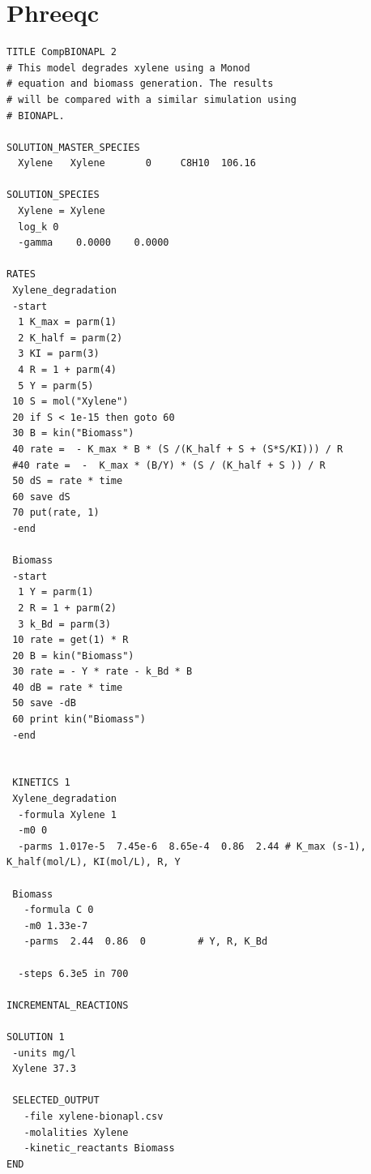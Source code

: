 \documentclass[12pt,twoside]{report}
\begin{document}
\section{Phreeqc}
\begin{verbatim}
TITLE CompBIONAPL 2
# This model degrades xylene using a Monod
# equation and biomass generation. The results
# will be compared with a similar simulation using
# BIONAPL.

SOLUTION_MASTER_SPECIES
  Xylene   Xylene       0     C8H10  106.16

SOLUTION_SPECIES
  Xylene = Xylene
  log_k 0
  -gamma    0.0000    0.0000

RATES
 Xylene_degradation
 -start
  1 K_max = parm(1)
  2 K_half = parm(2)
  3 KI = parm(3)  
  4 R = 1 + parm(4)
  5 Y = parm(5)
 10 S = mol("Xylene")
 20 if S < 1e-15 then goto 60
 30 B = kin("Biomass")
 40 rate =  - K_max * B * (S /(K_half + S + (S*S/KI))) / R
 #40 rate =  -  K_max * (B/Y) * (S / (K_half + S )) / R
 50 dS = rate * time
 60 save dS
 70 put(rate, 1)
 -end

 Biomass
 -start
  1 Y = parm(1)
  2 R = 1 + parm(2)
  3 k_Bd = parm(3)
 10 rate = get(1) * R
 20 B = kin("Biomass")
 30 rate = - Y * rate - k_Bd * B
 40 dB = rate * time
 50 save -dB
 60 print kin("Biomass")
 -end


 KINETICS 1
 Xylene_degradation
  -formula Xylene 1 
  -m0 0
  -parms 1.017e-5  7.45e-6  8.65e-4  0.86  2.44 # K_max (s-1), K_half(mol/L), KI(mol/L), R, Y
  
 Biomass
   -formula C 0
   -m0 1.33e-7
   -parms  2.44  0.86  0         # Y, R, K_Bd

  -steps 6.3e5 in 700

INCREMENTAL_REACTIONS

SOLUTION 1
 -units mg/l
 Xylene 37.3

 SELECTED_OUTPUT
   -file xylene-bionapl.csv
   -molalities Xylene 
   -kinetic_reactants Biomass
END
\end{verbatim}
\end{document}
